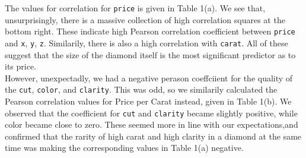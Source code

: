\documentclass[11pt,letterpaper]{article}
\begin{document}
The values for correlation for \texttt{price} is given in 
Table 1(a). We see that, unsurprisingly, there is a massive collection of high 
correlation squares at the bottom right. These indicate high Pearson 
correlation coefficient between \texttt{price} and \texttt{x}, \texttt{y}, 
\texttt{z}. Similarily, there is also a high correlation with \texttt{carat}.
All of these suggest that the size of the diamond itself is the most significant 
predictor as to its price. \\

However, unexpectadly, we had a negative perason coeffciient for the quality of 
the \texttt{cut}, \texttt{color}, and \texttt{clarity}. This was odd, so we
similarily calculated the Pearson correlation values for Price per Carat instead, 
given in Table 1(b). We observed that the coefficient for \texttt{cut} and 
\texttt{clarity} became slightly positive, while color became close to zero. 
These seemed more in line with our expectations,and confirmed that the rarity of 
high carat and high clarity in a diamond at the same time was making the 
corresponding values in Table 1(a) negative. 
\end{document}
